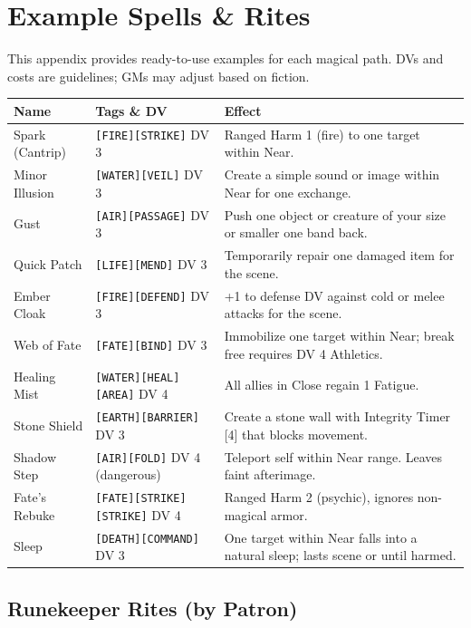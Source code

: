 
\section{Example Spells \& Rites}

This appendix provides ready-to-use examples for each magical path. DVs and costs are guidelines; GMs may adjust based on fiction.

\begin{tabular}{@{}l>{\raggedright\arraybackslash}p{3cm}>{\raggedright\arraybackslash}p{7cm}@{}}
    \toprule
    \textbf{Name} & \textbf{Tags \& DV} & \textbf{Effect} \\
    \midrule
    Spark (Cantrip) & \texttt{[FIRE][STRIKE]} DV 3 & Ranged Harm 1 (fire) to one target within Near. \\
    Minor Illusion & \texttt{[WATER][VEIL]} DV 3 & Create a simple sound or image within Near for one exchange. \\
    Gust & \texttt{[AIR][PASSAGE]} DV 3 & Push one object or creature of your size or smaller one band back. \\
    Quick Patch & \texttt{[LIFE][MEND]} DV 3 & Temporarily repair one damaged item for the scene. \\
    Ember Cloak & \texttt{[FIRE][DEFEND]} DV 3 & +1 to defense DV against cold or melee attacks for the scene. \\
    Web of Fate & \texttt{[FATE][BIND]} DV 3 & Immobilize one target within Near; break free requires DV 4 Athletics. \\
    Healing Mist & \texttt{[WATER][HEAL][AREA]} DV 4 & All allies in Close regain 1 Fatigue. \\
    Stone Shield & \texttt{[EARTH][BARRIER]} DV 3 & Create a stone wall with Integrity Timer [4] that blocks movement. \\
    Shadow Step & \texttt{[AIR][FOLD]} DV 4 (dangerous) & Teleport self within Near range. Leaves faint afterimage. \\
    Fate's Rebuke & \texttt{[FATE][STRIKE][STRIKE]} DV 4 & Ranged Harm 2 (psychic), ignores non-magical armor. \\
    Sleep & \texttt{[DEATH][COMMAND]} DV 3 & One target within Near falls into a natural sleep; lasts scene or until harmed. \\
    \bottomrule
    \end{tabular}
\subsection{Runekeeper Rites (by Patron)}

